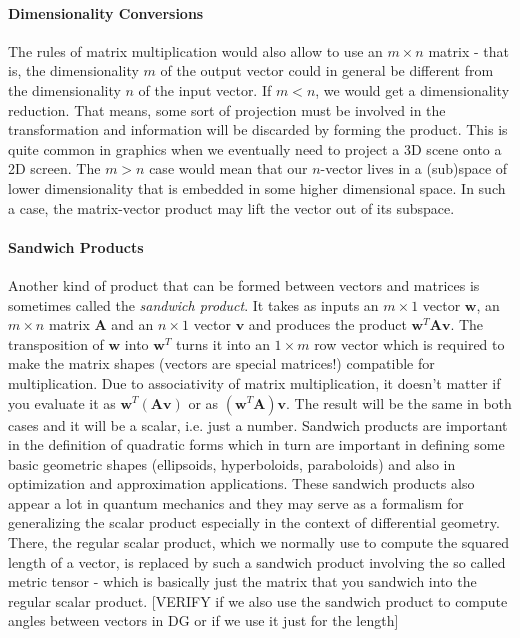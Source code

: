 

\paragraph{Dimensionality Conversions}
The rules of matrix multiplication would also allow to use an $m \times n$ matrix - that is, the dimensionality $m$ of the output vector could in general be different from the dimensionality $n$ of the input vector. If $m < n$, we would get a dimensionality reduction. That means, some sort of projection must be involved in the transformation and information will be discarded by forming the product. This is quite common in graphics when we eventually need to project a 3D scene onto a 2D screen. The $m > n$ case would mean that our $n$-vector lives in a (sub)space of lower dimensionality that is embedded in some higher dimensional space. In such a case, the matrix-vector product may lift the vector out of its subspace.

\paragraph{Sandwich Products}
Another kind of product that can be formed between vectors and matrices is sometimes called the \emph{sandwich product}. It takes as inputs an $m \times 1$ vector $\mathbf{w}$, an $m \times n$ matrix $\mathbf{A}$ and an $n \times 1$ vector $\mathbf{v}$ and produces the product $\mathbf{w}^T \mathbf{A v}$. The transposition of $\mathbf{w}$ into $\mathbf{w}^T$ turns it into an $1 \times m$ row vector which is required to make the matrix shapes (vectors are special matrices!) compatible for multiplication. Due to associativity of matrix multiplication, it doesn't matter if you evaluate it as $\mathbf{w}^T (\mathbf{A v})$ or as $(\mathbf{w}^T \mathbf{A}) \mathbf{v}$. The result will be the same in both cases and it will be a scalar, i.e. just a number. Sandwich products are important in the definition of quadratic forms which in turn are important in defining some basic geometric shapes (ellipsoids, hyperboloids, paraboloids) and also in optimization and approximation applications. These sandwich products also appear a lot in quantum mechanics and they may serve as a formalism for generalizing the scalar product especially in the context of differential geometry.  There, the regular scalar product, which we normally use to compute the squared length of a vector, is replaced by such a sandwich product involving the so called metric tensor - which is basically just the matrix that you sandwich into the regular scalar product. [VERIFY if we also use the sandwich product to compute angles between vectors in DG or if we use it just for the length]

